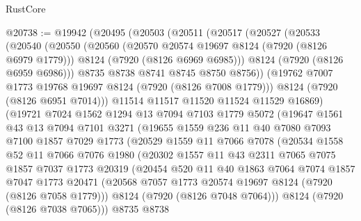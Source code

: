 \begin{lexlean}{RustCore}
\begin{coremodule}
@20738 := @19942
    (@20495
      (@20503
        (@20511
          (@20517
            (@20527
              (@20533
                (@20540
                  (@20550
                    (@20560
                      (@20570 @20574 @19697 @8124 (@7920 (@8126 @6979 @1779)))
                      @8124
                      (@7920 (@8126 @6969 @6985)))
                    @8124
                    (@7920 (@8126 @6959 @6986)))
                  @8735
                  @8738
                  @8741
                  @8745
                  @8750
                  @8756))
              (@19762 @7007 @1773 @19768 @19697 @8124 (@7920 (@8126 @7008 @1779)))
              @8124
              (@7920 (@8126 @6951 @7014)))
            @11514
            @11517
            @11520
            @11524
            @11529
            @16869)
          (@19721
            @7024
            @1562
            @1294
            @13
            @7094
            @7103
            @1779
            @5072
            (@19647
              @1561
              @43
              @13
              @7094
              @7101
              @3271
              (@19655
                @1559
                @236
                @11
                @40
                @7080
                @7093
                @7100
                @1857
                @7029
                @1773
                (@20529
                  @1559
                  @11
                  @7066
                  @7078
                  (@20534
                    @1558
                    @52
                    @11
                    @7066
                    @7076
                    @1980
                    (@20302
                      @1557
                      @11
                      @43
                      @2311
                      @7065
                      @7075
                      @1857
                      @7037
                      @1773
                      @20319
                      (@20454
                        @520
                        @11
                        @40
                        @1863
                        @7064
                        @7074
                        @1857
                        @7047
                        @1773
                        @20471
                        (@20568 @7057 @1773 @20574 @19697 @8124 (@7920 (@8126 @7058 @1779)))
                        @8124
                        (@7920 (@8126 @7048 @7064)))
                      @8124
                      (@7920 (@8126 @7038 @7065)))
                    @8735
                    @8738

\end{coremodule}
\end{lexlean}
